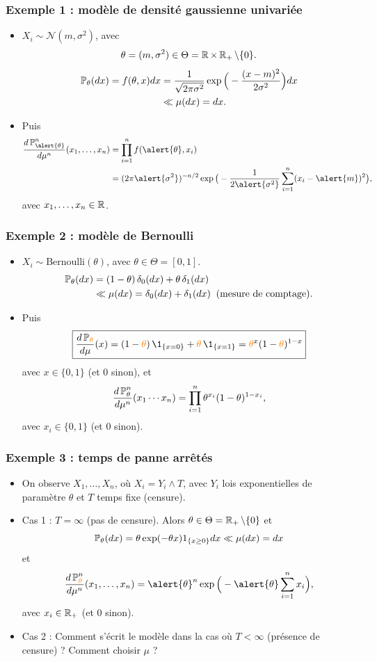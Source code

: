 \begin{frame}
\frametitle{Exemple 1 : modèle de densité gaussienne univariée}
\begin{itemize}
\item $X_i\sim {\mathcal N}(m,\sigma^2)$,
avec
$$\theta = (m,\sigma^2) \in \Theta = \operatorname{{\mathbb R}}\times \operatorname{{\mathbb R}}_+\setminus\{0\}.$$
\begin{align*}
\operatorname{{\mathbb P}}_\theta(dx) = f(\theta,x)dx & =\frac{1}{\sqrt{2\pi \sigma^2}}\exp\Big(-\frac{(x-m)^2}{2\sigma^2}\Big)dx \\
& \ll \mu(dx)=dx.
\end{align*}
\item Puis
\begin{align*}
\frac{d\PP_{\alert{\theta}}^n}{d\mu^n}(x_1,\ldots, x_n) & = \prod_{i = 1}^n f(\alert{\theta},x_i) \\
& =(2\pi \alert{\sigma^2})^{-n/2}\exp\big(-\frac{1}{2\alert{\sigma^2}}\sum_{i = 1}^n (x_i-\alert{m})^2\big),
\end{align*}
avec $x_1,\ldots,x_n \in \operatorname{{\mathbb R}}$.
\end{itemize}
\end{frame}

\begin{frame}
\frametitle{Exemple 2 :  modèle de Bernoulli}
\begin{itemize}
\item $X_i \sim \text{Bernoulli}(\theta)$, avec $\theta \in \Theta = [0,1]$.
\begin{align*}
\operatorname{{\mathbb P}}_\theta(dx)& = (1-\theta)\, \delta_{0}(dx) + \theta\, \delta_1(dx) \\
& \ll \mu(dx) = \delta_0(dx)+\delta_1(dx)\;\;\text{(mesure de comptage)}.
\end{align*}
\item Puis
$$\boxed{\frac{d\PP_{\tco{\theta}}}{d\mu}(x) = (1-\tco{\theta})\,\1_{\{x=0\}}+\tco{\theta}\,\1_{\{x=1\}} = \tco{\theta}^x(1-\tco{\theta})^{1-x}}
$$
\alert{avec $x\in \{0,1\}$} (et $0$ sinon), et
$$\frac{d\operatorname{{\mathbb P}}_\theta^n}{d\mu^n}(x_1\cdots x_n) = \prod_{i = 1}^n \theta^{x_i}(1-\theta)^{1-x_i},$$
\alert{avec $x_i \in \{0,1\}$} (et $0$ sinon).
\end{itemize}
\end{frame}

\begin{frame}
\frametitle{Exemple 3 : temps de panne  arrêtés}
\begin{itemize}
\item On observe $X_1,\ldots, X_n$, où $X_i = Y_i \wedge T$, avec $Y_i$ \alert{lois exponentielles} de paramètre $\theta$ et $T$ \alert{temps fixe} (censure).
\item Cas 1 : $T=\infty$ (pas de censure). Alors  $\theta \in \Theta = \operatorname{{\mathbb R}}_+\setminus \{0\}$ et
$$\operatorname{{\mathbb P}}_\theta(dx) = \theta \exp(-\theta x)1_{\{x \geq 0\}}dx \ll \mu(dx) = dx$$
et
$$\frac{d\PP_{\tco{\theta}}^n}{d\mu^n}(x_1,\ldots,x_n) = \alert{\theta}^n \exp\Big(-\alert{\theta} \sum_{i = 1}^n x_i\Big),$$
\alert{avec $x_i \in \operatorname{{\mathbb R}}_+$} (et $0$ sinon).
\item Cas 2 : \alert{Comment s'écrit le modèle} dans la cas où $T<\infty$ (présence de censure) ? Comment choisir $\mu$ ?
\end{itemize}
\end{frame}




